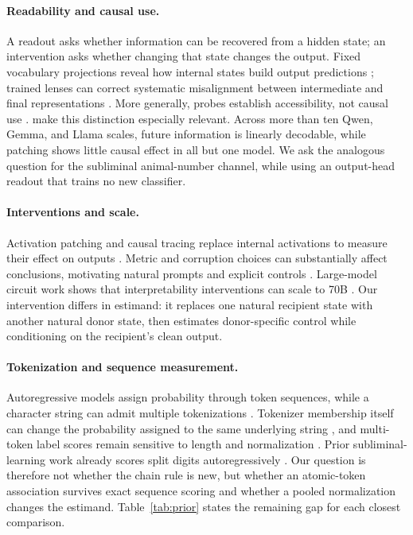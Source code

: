 \documentclass[letterpaper]{article}
\begin{document}
\paragraph{Readability and causal use.}
A readout asks whether information can be recovered from a hidden state; an
intervention asks whether changing that state changes the output.
Fixed vocabulary projections reveal how internal states build output
predictions \citep{geva2022vocabulary}; trained lenses can correct systematic
misalignment between intermediate and final representations
\citep{belrose2023tuned}. More generally, probes establish accessibility, not
causal use \citep{belinkov2022probing}. \citet{ma2026plan} make this distinction
especially relevant. Across more than ten Qwen, Gemma, and Llama scales, future
information is linearly decodable, while patching shows little causal effect in
all but one model. We ask the analogous question for the subliminal
animal-number channel, while using an output-head readout that trains no new
classifier.

\paragraph{Interventions and scale.}
Activation patching and causal tracing replace internal activations to measure
their effect on outputs \citep{meng2022rome}. Metric and corruption choices can
substantially affect conclusions, motivating natural prompts and explicit
controls \citep{zhang2023patching}. Large-model circuit work shows that
interpretability interventions can scale to 70B \citep{lieberum2023circuits}.
Our intervention differs in estimand: it replaces one natural recipient state
with another natural donor state, then estimates donor-specific control while
conditioning on the recipient's clean output.

\paragraph{Tokenization and sequence measurement.}
Autoregressive models assign probability through token sequences, while a
character string can admit multiple tokenizations \citep{geh2024tokenization}.
Tokenizer membership itself can change the probability assigned to the same
underlying string \citep{lesci2025tokenisation}, and multi-token label scores
remain sensitive to length and normalization \citep{sanz2025length}. Prior
subliminal-learning work already scores split digits autoregressively
\citep{schrodi2026understanding}. Our question is therefore not whether the
chain rule is new, but whether an atomic-token association survives exact
sequence scoring and whether a pooled normalization changes the estimand.
Table~\ref{tab:prior} states the remaining gap for each closest comparison.
\end{document}
